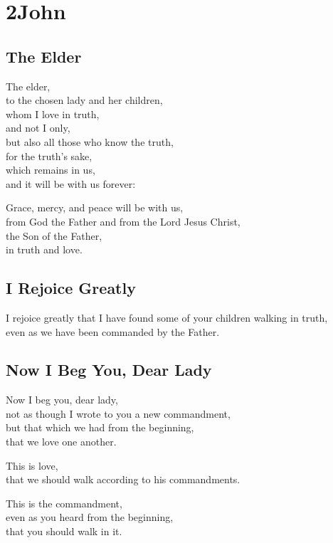 \documentclass[twoside, openany, 12pt]{extbook}
\begin{document}
\chapter{2John}

\newpage\section{The Elder}

The elder,
\\
to the chosen lady and her children,
\\
whom I love in truth,
\\
and not I only,
\\
but also all those who know the truth,
\\
for the truth's sake,
\\
which remains in us,
\\
and it will be with us forever:

Grace, mercy, and peace will be with us,
\\
from God the Father and from the Lord Jesus Christ,
\\
the Son of the Father,
\\
in truth and love.

\newpage\section{I Rejoice Greatly}

I rejoice greatly that I have found some of your children walking in truth,
\\
even as we have been commanded by the Father.

\newpage\section{Now I Beg You, Dear Lady}

Now I beg you, dear lady,
\\
not as though I wrote to you a new commandment,
\\
but that which we had from the beginning,
\\
that we love one another.

This is love,
\\
that we should walk according to his commandments.

This is the commandment,
\\
even as you heard from the beginning,
\\
that you should walk in it.
\end{document}

